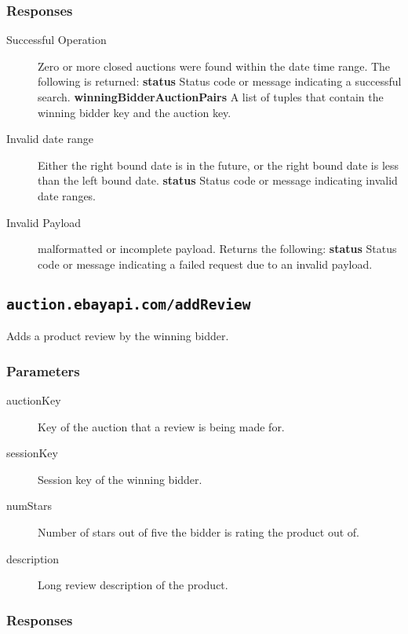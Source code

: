 \documentclass{article}
\newcommand{\code}[1]{\colorbox{light-gray}{\texttt{#1}}}
\begin{document}
\subsubsection{Responses}

\begin{description}
    \item[Successful Operation] Zero or more closed auctions were found within
        the date time range. The following is returned:
        \subitem\textbf{status} Status code or message indicating a successful
        search.
        \subitem\textbf{winningBidderAuctionPairs} A list of tuples that
        contain the winning bidder key and the auction key.

    \item[Invalid date range] Either the right bound date is in the future, or
        the right bound date is less than the left bound date.
        \subitem\textbf{status} Status code or message indicating invalid date
        ranges.

    \item[Invalid Payload] malformatted or incomplete payload. Returns the
        following:
        \subitem\textbf{status} Status code or message indicating a failed
        request due to an invalid payload.
\end{description}


\subsection{\code{auction.ebayapi.com/addReview}}
Adds a product review by the winning bidder.

\subsubsection{Parameters}
\begin{description}
    \item[auctionKey] Key of the auction that a review is being made for.
    \item[sessionKey] Session key of the winning bidder.
    \item[numStars] Number of stars out of five the bidder is rating the product out of.
    \item[description] Long review description of the product.
\end{description}

\subsubsection{Responses}
\end{document}
